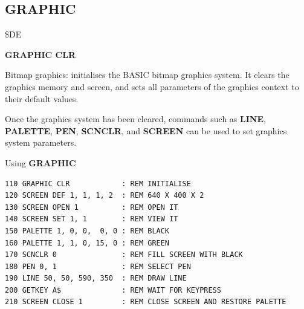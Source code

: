 \subsection{GRAPHIC}
\begin{description}[leftmargin=2cm,style=nextline]
\item [Token:]    \$DE

\item [Format:]   {\bf GRAPHIC CLR}

\item [Usage:]    Bitmap graphics: initialises the BASIC bitmap graphics system. It clears the graphics memory and screen, and sets all parameters of the graphics context to their default values.

                  Once the graphics system has been cleared, commands such as {\bf LINE}, {\bf PALETTE}, {\bf PEN}, {\bf SCNCLR}, and {\bf SCREEN} can be used to set graphics system parameters.

\item [Example:]  Using {\bf GRAPHIC}

\begin{tcolorbox}[colback=black,coltext=white]
\verbatimfont{\codefont}
\begin{verbatim}
110 GRAPHIC CLR            : REM INITIALISE
120 SCREEN DEF 1, 1, 1, 2  : REM 640 X 400 X 2
130 SCREEN OPEN 1          : REM OPEN IT
140 SCREEN SET 1, 1        : REM VIEW IT
150 PALETTE 1, 0, 0,  0, 0 : REM BLACK
160 PALETTE 1, 1, 0, 15, 0 : REM GREEN
170 SCNCLR 0               : REM FILL SCREEN WITH BLACK
180 PEN 0, 1               : REM SELECT PEN
190 LINE 50, 50, 590, 350  : REM DRAW LINE
200 GETKEY A$              : REM WAIT FOR KEYPRESS
210 SCREEN CLOSE 1         : REM CLOSE SCREEN AND RESTORE PALETTE
\end{verbatim}
\end{tcolorbox}
\end{description}



\newpage

